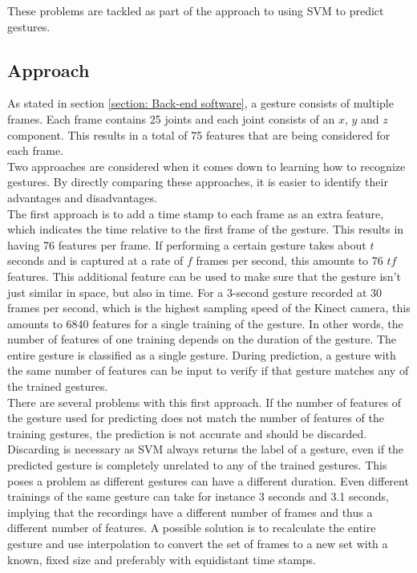 These problems are tackled as part of the approach to using SVM to predict gestures.


\subsection{Approach}

As stated in section \ref{section: Back-end software}, a gesture consists of multiple frames. Each frame contains 25 joints and each joint consists of an $x$, $y$ and $z$ component. This results in a total of 75 features that are being considered for each frame.\\

Two approaches are considered when it comes down to learning how to recognize gestures. By directly comparing these approaches, it is easier to identify their advantages and disadvantages.\\

The first approach is to add a time stamp to each frame as an extra feature, which indicates the time relative to the first frame of the gesture. This results in having 76 features per frame. If performing a certain gesture takes about $t$ seconds and is captured at a rate of $f$ frames per second, this amounts to 76 $tf$ features. This additional feature can be used to make sure that the gesture isn't just similar in space, but also in time. For a 3-second gesture recorded at 30 frames per second, which is the highest sampling speed of the Kinect camera, this amounts to 6840 features for a single training of the gesture. In other words, the number of features of one training depends on the duration of the gesture. The entire gesture is classified as a single gesture. During prediction, a gesture with the same number of features can be input to verify if that gesture matches any of the trained gestures.\\

There are several problems with this first approach. If the number of features of the gesture used for predicting does not match the number of features of the training gestures, the prediction is not accurate and should be discarded. Discarding is necessary as SVM always returns the label of a gesture, even if the predicted gesture is completely unrelated to any of the trained gestures. This poses a problem as different gestures can have a different duration. Even different trainings of the same gesture can take for instance 3 seconds and 3.1 seconds, implying that the recordings have a different number of frames and thus a different number of features. A possible solution is to recalculate the entire gesture and use interpolation to convert the set of frames to a new set with a known, fixed size and preferably with equidistant time stamps.\\

